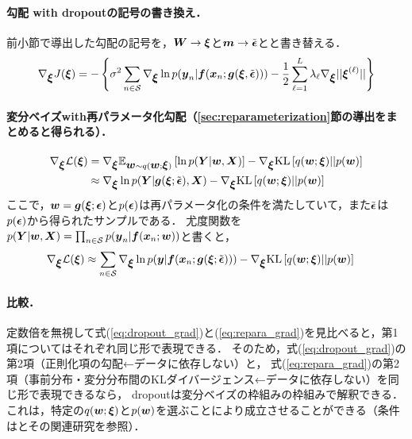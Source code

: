 \paragraph{勾配 with dropoutの記号の書き換え．}
前小節で導出した勾配の記号を，$\mbox{\boldmath $W$}\to\mbox{\boldmath $\xi$}$と$\mbox{\boldmath $m$}\to\tilde{\mbox{\boldmath $\epsilon$}}$とと書き替える．
\begin{align}
\nabla_{\vxi} J(\vxi)
= -\left\{ \sigma^2\sum_{n\in\mathcal{S}} \nabla_{\vxi}\ln p(\vy_n|\vf(\vx_n;\vg(\vxi,\tilde{\vepsilon}))) - \frac{1}{2}\sum_{\ell=1}^{L}\lambda_{\ell}\nabla_{\vxi}||\vxi^{(\ell)}|| \right\}
\label{eq:dropout_grad}
\end{align}


\paragraph{変分ベイズwith再パラメータ化勾配（\ref{sec:reparameterization}節の導出をまとめると得られる）．}
\begin{align*}
\nabla_{\mbox{\boldmath $\xi$}}{\mathcal{L}}(\mbox{\boldmath $\xi$})
&=
\nabla_{\mbox{\boldmath $\xi$}}
\mathbb{E}_{\mbox{\boldmath $w$}\sim q(\mbox{\boldmath $w$};\mbox{\boldmath $\xi$})}
\left[
\ln p(\mbox{\boldmath $Y$}|\mbox{\boldmath $w$},\mbox{\boldmath $X$})
\right]
-
\nabla_{\mbox{\boldmath $\xi$}}
\mbox{KL}\left[
q(\mbox{\boldmath $w$};\mbox{\boldmath $\xi$})||p(\mbox{\boldmath $w$})
\right]
\\
&\approx
\nabla_{\mbox{\boldmath $\xi$}}
\ln p(\mbox{\boldmath $Y$}|\mbox{\boldmath $g$}(\mbox{\boldmath $\xi$};\tilde{\mbox{\boldmath $\epsilon$}}),\mbox{\boldmath $X$})
-
\nabla_{\mbox{\boldmath $\xi$}}
\mbox{KL}\left[
q(\mbox{\boldmath $w$};\mbox{\boldmath $\xi$})||p(\mbox{\boldmath $w$})
\right]
\end{align*}
ここで，$\mbox{\boldmath $w$}=\mbox{\boldmath $g$}(\mbox{\boldmath $\xi$};\mbox{\boldmath $\epsilon$})$と$p(\mbox{\boldmath $\epsilon$})$は再パラメータ化の条件を満たしていて，また$\tilde{\mbox{\boldmath $\epsilon$}}$は$p(\mbox{\boldmath $\epsilon$})$から得られたサンプルである．
尤度関数を$p(\mbox{\boldmath $Y$}|\mbox{\boldmath $w$},\mbox{\boldmath $X$})=\prod_{n\in\mathcal{S}}p(\mbox{\boldmath $y$}_n|\mbox{\boldmath $f$}(\mbox{\boldmath $x$}_n;\mbox{\boldmath $w$}))$と書くと，
\begin{align}
\nabla_{\vxi}{\mathcal{L}}(\vxi)
&\approx
\sum_{n\in\mathcal{S}}
\nabla_{\vxi}
\ln p(\vy|\vf(\vx_n;\vg(\vxi;\tilde{\vepsilon})))
-
\nabla_{\vxi}
\mbox{KL}\left[
q(\vw;\vxi)||p(\vw)
\right]
\label{eq:repara_grad}
\end{align}

\paragraph{比較．}
定数倍を無視して式(\ref{eq:dropout_grad})と(\ref{eq:repara_grad})を見比べると，第1項についてはそれぞれ同じ形で表現できる．
そのため，式(\ref{eq:dropout_grad})の第2項（正則化項の勾配←データに依存しない）と，
式(\ref{eq:repara_grad})の第2項（事前分布・変分分布間のKLダイバージェンス←データに依存しない）を同じ形で表現できるなら，
dropoutは変分ベイズの枠組みの枠組みで解釈できる．
これは，特定の$q(\mbox{\boldmath $w$};\mbox{\boldmath $\xi$})$と$p(\mbox{\boldmath $w$})$を選ぶことにより成立させることができる（条件は\cite{gal2016dropout}とその関連研究を参照）．

